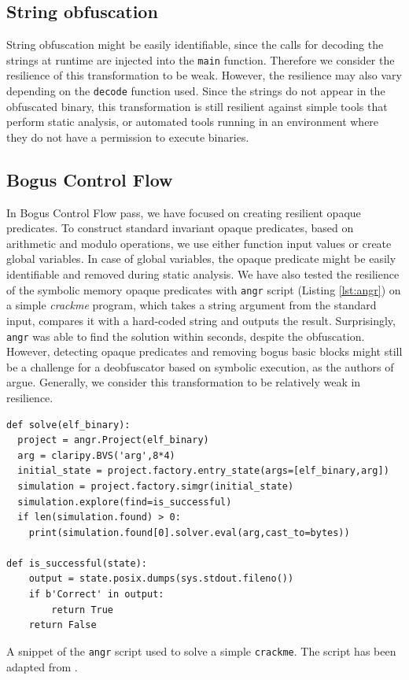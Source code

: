 \documentclass[
  digital, %
  notable,   %
  twoside, %
  nolof,     %
  nolot,     %
]{fithesis3}
\theoremstyle{definition}
\begin{document}
\subsection{String obfuscation}
String obfuscation might be easily identifiable, since the calls for decoding the strings at runtime are injected into the \texttt{main} function. Therefore we consider the resilience of this transformation to be weak. However, the resilience may also vary depending on the \texttt{decode} function used. Since the strings do not appear in the obfuscated binary, this transformation is still resilient against simple tools that perform static analysis, or automated tools running in an environment where they do not have a permission to execute binaries. 

\subsection{Bogus Control Flow}

In Bogus Control Flow pass, we have focused on creating resilient opaque predicates. To construct standard invariant opaque predicates, based on arithmetic and modulo operations, we use either function input values or create global variables. In case of global variables, the opaque predicate might be easily identifiable and removed during static analysis. We have also tested the resilience of the symbolic memory opaque predicates with \texttt{angr} script (Listing \ref{lst:angr}) on a simple \textit{crackme} program, which takes a string argument from the standard input, compares it with a hard-coded string and outputs the result. Surprisingly, \texttt{angr} was able to find the solution within seconds, despite the obfuscation. However, detecting opaque predicates and removing bogus basic blocks might still be a challenge for a deobfuscator based on symbolic execution, as the authors of \cite{bi_opaque} argue. Generally, we consider this transformation to be relatively weak in resilience. 

\begin{listing}[!h]
\begin{verbatim}
def solve(elf_binary):
  project = angr.Project(elf_binary) 
  arg = claripy.BVS('arg',8*4)
  initial_state = project.factory.entry_state(args=[elf_binary,arg]) 
  simulation = project.factory.simgr(initial_state) 
  simulation.explore(find=is_successful)
  if len(simulation.found) > 0:
    print(simulation.found[0].solver.eval(arg,cast_to=bytes))

def is_successful(state):
	output = state.posix.dumps(sys.stdout.fileno())
	if b'Correct' in output: 
		return True
	return False
\end{verbatim}
\label{lst:angr}
\caption{A snippet of the \texttt{angr} script used to solve a simple \texttt{crackme}. The script has been adapted from \cite{crackme_angr}.}
\end{listing}
\end{document}
